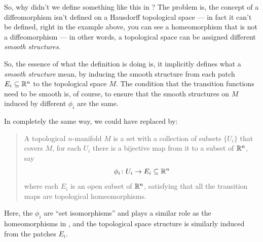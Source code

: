 So, why didn't we define something like this in ?
The problem is, the concept of a diffeomorphism isn't defined on a Hausdorff topological space ---
in fact it can't be defined, right in the example above, you can see a homeomorphism that is not
a diffeomorphism --- in other words, a topological space can be assigned different \emph{smooth
structures}.

So, the essence of what the definition  is doing is, it implicitly defines
what a \emph{smooth structure} mean, by inducing the smooth structure from each patch $E_i \subseteq
\mathbb R^n$ to the topological space $M$.
The condition that the transition functions need to be smooth is, of course, to ensure that the
smooth structures on $M$ induced by different $\phi_i$ are the same.

In completely the same way, we could have replaced  by:
\begin{quote}
	A topological $n$-manifold $M$ is a set with a collection of subsets $\{ U_i \}$ that covers
	$M$, for each $U_i$ there is a bijective map from it to a subset of $\mathbb R^n$, say
	\[ \phi_i \colon U_i \to E_i \subseteq \mathbb R^n \]
	where each $E_i$ is an open subset of $\mathbb R^n$, satisfying that all the transition maps are
	topological homeomorphisms.
\end{quote}

Here, the $\phi_i$ are ``set isomorphisms'' and plays a similar role as the homeomorphisms in
, and the topological space structure is
similarly induced from the patches $E_i$.

